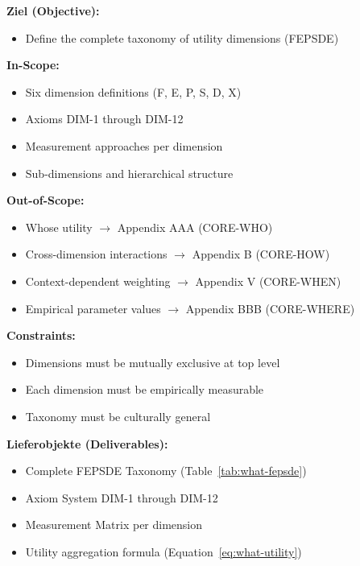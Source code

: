 \begin{tcolorbox}[
    colback=orange!5!white,
    colframe=orange!75!black,
    title={\textbf{Appendix Scope: Ziel / In-Scope / Out-of-Scope / Constraints}},
    fonttitle=\bfseries
]

\textbf{Ziel (Objective):}
\begin{itemize}[nosep]
    \item Define the complete taxonomy of utility dimensions (FEPSDE)
\end{itemize}

\textbf{In-Scope:}
\begin{itemize}[nosep]
    \item Six dimension definitions (F, E, P, S, D, X)
    \item Axioms DIM-1 through DIM-12
    \item Measurement approaches per dimension
    \item Sub-dimensions and hierarchical structure
\end{itemize}

\textbf{Out-of-Scope:}
\begin{itemize}[nosep]
    \item Whose utility $\rightarrow$ Appendix AAA (CORE-WHO)
    \item Cross-dimension interactions $\rightarrow$ Appendix B (CORE-HOW)
    \item Context-dependent weighting $\rightarrow$ Appendix V (CORE-WHEN)
    \item Empirical parameter values $\rightarrow$ Appendix BBB (CORE-WHERE)
\end{itemize}

\textbf{Constraints:}
\begin{itemize}[nosep]
    \item Dimensions must be mutually exclusive at top level
    \item Each dimension must be empirically measurable
    \item Taxonomy must be culturally general
\end{itemize}

\textbf{Lieferobjekte (Deliverables):}
\begin{itemize}[nosep]
    \item Complete FEPSDE Taxonomy (Table~\ref{tab:what-fepsde})
    \item Axiom System DIM-1 through DIM-12
    \item Measurement Matrix per dimension
    \item Utility aggregation formula (Equation~\ref{eq:what-utility})
\end{itemize}

\end{tcolorbox}

